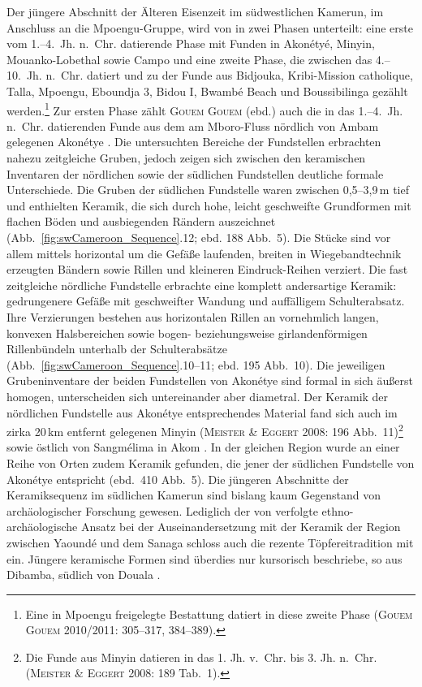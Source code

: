 Der jüngere Abschnitt der Älteren Eisenzeit im südwestlichen Kamerun, im Anschluss an die Mpoengu-Gruppe, wird von \textcite[379\,f.]{GouemGouem.20102011} in zwei Phasen unterteilt: eine erste vom 1.--4.~Jh. n.~Chr. datierende Phase mit Funden in Akonétyé, Minyin, Mouanko-Lobethal sowie Campo und eine zweite Phase, die zwischen das 4.--10.~Jh. n.~Chr. datiert und zu der Funde aus Bidjouka, Kribi-Mission catholique, Talla, Mpoengu, Eboundja 3, Bidou I, Bwambé Beach und Boussibilinga gezählt werden.\footnote{Eine in Mpoengu freigelegte Bestattung datiert in diese zweite Phase (\textsc{Gouem Gouem} 2010/2011: 305--317, 384--389).} Zur ersten Phase zählt \textsc{Gouem Gouem} (ebd.) auch die in das 1.--4.~Jh. n.~Chr. datierenden Funde aus dem am Mboro-Fluss nördlich von Ambam gelegenen Akonétye \parencite[184]{Meister.2008b}. Die untersuchten Bereiche der Fundstellen erbrachten nahezu zeitgleiche Gruben, jedoch zeigen sich zwischen den keramischen Inventaren der nördlichen sowie der südlichen Fundstellen deutliche formale Unterschiede. Die Gruben der südlichen Fundstelle waren zwischen 0,5--3,9\,m tief und enthielten Keramik, die sich durch hohe, leicht geschweifte Grundformen mit flachen Böden und ausbiegenden Rändern auszeichnet (Abb.~\ref{fig:swCameroon_Sequence}.12; ebd. 188 Abb.~5). Die Stücke sind vor allem mittels horizontal um die Gefäße laufenden, breiten in Wiegebandtechnik erzeugten Bändern sowie Rillen und kleineren Eindruck-Reihen verziert. Die fast zeitgleiche nördliche Fundstelle erbrachte eine komplett andersartige Keramik: gedrungenere Gefäße mit geschweifter Wandung und auffälligem Schulterabsatz. Ihre Verzierungen bestehen aus horizontalen Rillen an vornehmlich langen, konvexen Halsbereichen sowie bogen- beziehungsweise girlandenförmigen Rillenbündeln unterhalb der Schulterabsätze (Abb.~\ref{fig:swCameroon_Sequence}.10--11; ebd. 195 Abb.~10). Die jeweiligen Grubeninventare der beiden Fundstellen von Akonétye sind formal in sich äußerst homogen, unterscheiden sich untereinander aber diametral. Der Keramik der nördlichen Fundstelle aus Akonétye entsprechendes Material fand sich auch im zirka 20\,km entfernt gelegenen Minyin (\textsc{Meister \& Eggert} 2008: 196 Abb.~11)\footnote{Die Funde aus Minyin datieren in das 1. Jh. v.~Chr. bis 3. Jh. n.~Chr. (\textsc{Meister \& Eggert} 2008: 189 Tab.~1).} sowie östlich von Sangmélima in Akom \parencite[413 Abb.~6.1,10]{deSaulieu.2015}. In der gleichen Region wurde an einer Reihe von Orten zudem Keramik gefunden, die jener der südlichen Fundstelle von Akonétye entspricht (ebd.~410 Abb.~5). Die jüngeren Abschnitte der Keramiksequenz im südlichen Kamerun sind bislang kaum Gegenstand von archäologischer Forschung gewesen. Lediglich der von \textcite{Elouga.20002001} verfolgte ethno-archäologische Ansatz bei der Auseinandersetzung mit der Keramik der Region zwischen Yaoundé und dem Sanaga schloss auch die rezente Töpfereitradition mit ein. Jüngere keramische Formen sind überdies nur kursorisch beschriebe, so aus Dibamba, südlich von Douala \parencite{Saulieu.2017}.